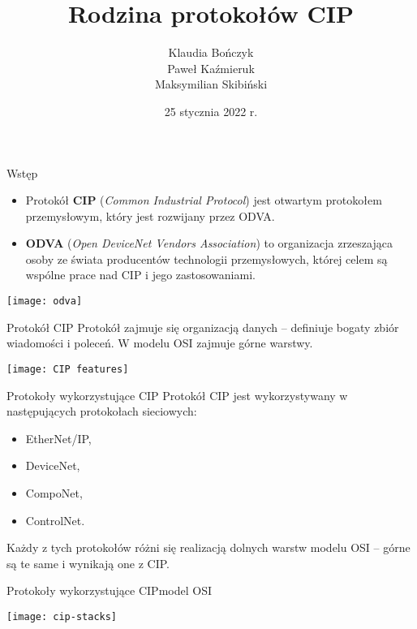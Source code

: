 \documentclass[11pt]{beamer}
\title[Rodzina protokołów CIP]{%
	Rodzina protokołów CIP
}
\author[Bończyk, Kaźmieruk, Skibiński]
	{Klaudia Bończyk\\Paweł Kaźmieruk\\Maksymilian Skibiński}
\date{25 stycznia 2022 r.}
\begin{document}
\frame{\titlepage}


\begin{frame}{Wstęp}
\begin{itemize}
\item Protokół \textbf{CIP} (\emph{Common Industrial Protocol}) jest otwartym protokołem przemysłowym, który jest rozwijany przez ODVA.
\item \textbf{ODVA} (\emph{Open DeviceNet Vendors Association}) to organizacja zrzeszająca osoby ze świata producentów technologii przemysłowych, której celem są wspólne prace nad CIP i jego zastosowaniami.
\end{itemize}

\medskip

\begin{center}
	\texttt{[image: odva]}
\end{center}
\end{frame}


\begin{frame}{Protokół CIP}
Protokół zajmuje się organizacją danych -- definiuje bogaty zbiór wiadomości i poleceń. W modelu OSI zajmuje
górne warstwy.

\medskip

\begin{center}
	\texttt{[image: CIP features]}
\end{center}
\end{frame}



\begin{frame}{Protokoły wykorzystujące CIP}
Protokół CIP jest wykorzystywany w następujących protokołach sieciowych:
\begin{itemize}
\item EtherNet/IP,
\item DeviceNet,
\item CompoNet,
\item ControlNet.
\end{itemize}

\medskip

Każdy z tych protokołów różni się realizacją dolnych warstw modelu OSI -- górne są te same i wynikają one z CIP.
\end{frame}


\begin{frame}{Protokoły wykorzystujące CIP}{model OSI}
\begin{center}
	\texttt{[image: cip-stacks]}
\end{center}
\end{frame}
\end{document}
